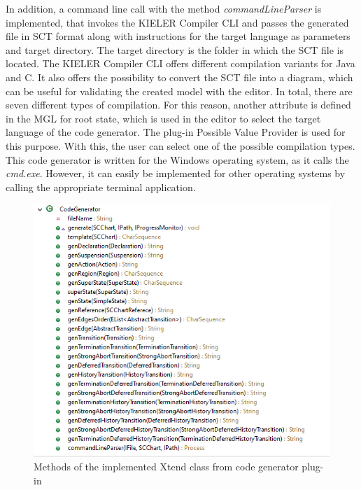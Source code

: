 In addition, a command line call with the method \textit{commandLineParser} is implemented, that invokes the KIELER Compiler CLI and passes the generated file in SCT format along with instructions for the target language as parameters and target directory. The target directory is the folder in which the SCT file is located. The KIELER Compiler CLI offers different compilation variants for Java and C. It also offers the possibility to convert the SCT file into a diagram, which can be useful for validating the created model with the editor. In total, there are seven different types of compilation. For this reason, another attribute is defined in the MGL for root state, which is used in the editor to select the target language of the code generator. The plug-in Possible Value Provider is used for this purpose. With this, the user can select one of the possible compilation types. This code generator is written for the Windows operating system, as it calls the \textit{cmd.exe}. However, it can easily be implemented for other operating systems by calling the appropriate terminal application.

\begin{figure}[h!]
\centering
\includegraphics[width=1.0\textwidth]{bilder/CodeGenClasses.png}
\caption{Methods of the implemented Xtend class from code generator plug-in}
\label{fig:CodeGenClasses}
\end{figure} 

